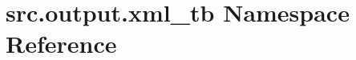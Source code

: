 \hypertarget{namespacesrc_1_1output_1_1xml__tb}{\section{src.\+output.\+xml\+\_\+tb Namespace Reference}
\label{namespacesrc_1_1output_1_1xml__tb}
}
